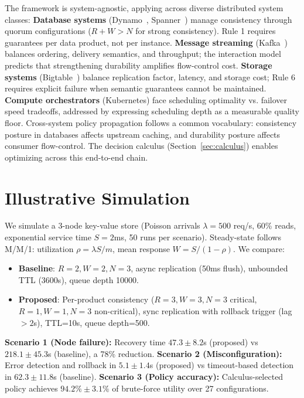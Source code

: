 \documentclass[conference]{IEEEtran}
\begin{document}
The framework is system-agnostic, applying across diverse distributed system classes:
\textbf{Database systems} (Dynamo~\cite{dynamo}, Spanner~\cite{spanner}) manage consistency through quorum configurations ($R+W > N$ for strong consistency). Rule 1 requires guarantees per data product, not per instance.
\textbf{Message streaming} (Kafka~\cite{kafka}) balances ordering, delivery semantics, and throughput; the interaction model predicts that strengthening durability amplifies flow-control cost.
\textbf{Storage systems} (Bigtable~\cite{bigtable}) balance replication factor, latency, and storage cost; Rule 6 requires explicit failure when semantic guarantees cannot be maintained.
\textbf{Compute orchestrators} (Kubernetes) face scheduling optimality vs. failover speed tradeoffs, addressed by expressing scheduling depth as a measurable quality floor.
Cross-system policy propagation follows a common vocabulary: consistency posture in databases affects upstream caching, and durability posture affects consumer flow-control. The decision calculus (Section~\ref{sec:calculus}) enables optimizing across this end-to-end chain.

\section{Illustrative Simulation}
\label{sec:eval}

We simulate a 3-node key-value store (Poisson arrivals $\lambda=500$ req/s, 60\% reads, exponential service time $S=2$ms, 50 runs per scenario). Steady-state follows M/M/1: utilization $\rho = \lambda S / m$, mean response $W = S/(1-\rho)$. We compare:
\begin{itemize}
    \item \textbf{Baseline}: $R=2, W=2, N=3$, async replication (50ms flush), unbounded TTL (3600s), queue depth 10000.
    \item \textbf{Proposed}: Per-product consistency ($R=3,W=3,N=3$ critical, $R=1,W=1,N=3$ non-critical), sync replication with rollback trigger (lag $>2$s), TTL=10s, queue depth=500.
\end{itemize}
\textbf{Scenario 1 (Node failure):} Recovery time $47.3 \pm 8.2$s (proposed) vs $218.1 \pm 45.3$s (baseline), a 78\% reduction.
\textbf{Scenario 2 (Misconfiguration):} Error detection and rollback in $5.1 \pm 1.4$s (proposed) vs timeout-based detection in $62.3 \pm 11.8$s (baseline).
\textbf{Scenario 3 (Policy accuracy):} Calculus-selected policy achieves $94.2\% \pm 3.1\%$ of brute-force utility over 27 configurations.
\end{document}

